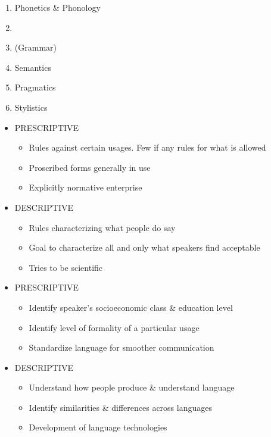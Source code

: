 \documentclass[a4paper,landscape,headrule,footrule]{foils}
\begin{document}
\begin{enumerate}\addtolength{\itemsep}{-0.75ex}
\item Phonetics \& Phonology
\item {}
\item {} (Grammar)
\item Semantics 
\item Pragmatics
\item Stylistics
\end{enumerate}


\begin{itemize}
\item
PRESCRIPTIVE
\begin{itemize}
\item Rules against certain
usages. Few if any
rules for what is
allowed
\item Proscribed forms
generally in use
\item Explicitly normative
enterprise
\end{itemize}
\item DESCRIPTIVE
\begin{itemize}
\item Rules characterizing
what people do say
\item Goal to characterize all
and only what speakers
find acceptable
\item Tries to be scientific
\end{itemize}
\end{itemize}


\begin{itemize}
\item PRESCRIPTIVE
  \begin{itemize}
  \item Identify speaker’s
    socioeconomic class
    \& education level
  \item Identify level of
    formality of a
    particular usage
  \item Standardize language for smoother communication
  \end{itemize}
\item DESCRIPTIVE
  \begin{itemize}
  \item Understand how
    people produce \&
    understand language
  \item Identify similarities
    \& differences across
    languages
  \item Development of
    language technologies
  \end{itemize}
\end{itemize}
\end{document}
